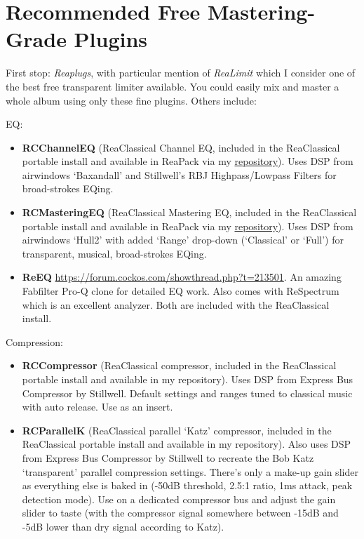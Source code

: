 \documentclass[10pt,american]{article}
\begin{document}
\section{Recommended Free Mastering-Grade Plugins}

First stop: \emph{Reaplugs}, with particular mention of \emph{ReaLimit} which I
consider one of the best free transparent limiter available. You could easily
mix and master a whole album using only these fine plugins. Others include:

EQ: 
\begin{itemize}
\item \textbf{RCChannelEQ} (ReaClassical Channel EQ, included in the
ReaClassical portable install and available in ReaPack via my
\href{https://github.com/chmaha/ReaClassical/raw/main/index.xml}{repository}).
Uses DSP from airwindows `Baxandall' and Stillwell's RBJ Highpass/Lowpass
Filters for broad-strokes EQing.
\item \textbf{RCMasteringEQ} (ReaClassical Mastering EQ, included in the
ReaClassical portable install and available in ReaPack via my
\href{https://github.com/chmaha/ReaClassical/raw/main/index.xml}{repository}).
Uses DSP from airwindows `Hull2' with added `Range' drop-down (`Classical' or
`Full') for transparent, musical, broad-strokes EQing.
\item \textbf{ReEQ
}\href{https://forum.cockos.com/showthread.php?t=213501}{https://forum.cockos.com/showthread.php?t=213501}.
An amazing Fabfilter Pro-Q clone for detailed EQ work. Also comes with
ReSpectrum which is an excellent analyzer. Both are included with the
ReaClassical install.
\end{itemize}
Compression: 
\begin{itemize}
\item \textbf{RCCompressor} (ReaClassical compressor, included in the
ReaClassical portable install and available in my repository). Uses DSP from
Express Bus Compressor by Stillwell. Default settings and ranges tuned to
classical music with auto release. Use as an insert.
\item \textbf{RCParallelK} (ReaClassical parallel `Katz' compressor, included in
the ReaClassical portable install and available in my repository). Also uses DSP
from Express Bus Compressor by Stillwell to recreate the Bob Katz `transparent'
parallel compression settings. There's only a make-up gain slider as everything
else is baked in (-50dB threshold, 2.5:1 ratio, 1ms attack, peak detection
mode). Use on a dedicated compressor bus and adjust the gain slider to taste
(with the compressor signal somewhere between -15dB and -5dB lower than dry
signal according to Katz).
\end{itemize}
\end{document}

